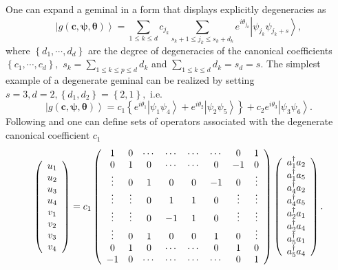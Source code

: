 \documentclass[aps,preprint]{revtex4}%
\begin{document}
One can expand a geminal in a form that displays explicitly degeneracies as
\begin{equation}
\left\vert g\left(  \boldsymbol{c},\boldsymbol{\psi,\theta}\right)
\right\rangle =\sum_{1\leq k\leq d}c_{j_{k}}\sum_{s_{k}+1\leq j_{k}\leq
s_{k}+d_{k}}e^{i\theta_{j_{k}}}\left\vert \psi_{j_{k}}\psi_{j_{k}%
+s}\right\rangle ,
\end{equation}
where $\left\{  d_{1},\cdots,d_{d}\right\}  $ are the degree of degeneracies
of the canonical coefficients $\left\{  c_{1},\cdots,c_{d}\right\}  ,$
$s_{k}=\sum\limits_{1\leq k\leq p\leq d}d_{k}$ and $\sum\limits_{1\leq k\leq
d}d_{k}=s_{d}=s.$ The simplest example of a degenerate geminal can be realized
by setting $s=3,d=2,\left\{  d_{1},d_{2}\right\}  =\left\{  2,1\right\}  ,$
i.e.
\begin{equation}
\left\vert g\left(  \boldsymbol{c},\boldsymbol{\psi,\theta}\right)
\right\rangle =c_{1}\left\{  e^{i\theta_{1}}\left\vert \psi_{1}\psi
_{4}\right\rangle +e^{i\theta_{2}}\left\vert \psi_{2}\psi_{5}\right\rangle
\right\}  +c_{2}e^{i\theta_{3}}\left\vert \psi_{3}\psi_{6}\right\rangle .
\end{equation}
Following \cite{AGPCoherent} and \cite{OrtizWeiner2006} one can define sets of
operators associated with the degenerate canonical coefficient $c_{1}$%
\begin{equation}
\left(
\begin{array}
[c]{c}%
u_{1}\\
u_{2}\\
u_{3}\\
u_{4}\\
v_{1}\\
v_{2}\\
v_{3}\\
v_{4}%
\end{array}
\right)  =c_{1}\left(
\begin{array}
[c]{cccccccc}%
1 & 0 & \cdots & \cdots & \cdots & \cdots & 0 & 1\\
0 & 1 & 0 & \cdots & \cdots & 0 & -1 & 0\\
\vdots & 0 & 1 & 0 & 0 & -1 & 0 & \vdots\\
\vdots & \vdots & 0 & 1 & 1 & 0 & \vdots & \vdots\\
\vdots & \vdots & 0 & -1 & 1 & 0 & \vdots & \vdots\\
\vdots & 0 & 1 & 0 & 0 & 1 & 0 & \vdots\\
0 & 1 & 0 & \cdots & \cdots & 0 & 1 & 0\\
-1 & 0 & \cdots & \cdots & \cdots & \cdots & 0 & 1
\end{array}
\right)  \left(
\begin{array}
[c]{c}%
a_{1}^{\dagger}a_{2}\\
a_{1}^{\dagger}a_{5}\\
a_{4}^{\dagger}a_{2}\\
a_{4}^{\dagger}a_{5}\\
a_{2}^{\dagger}a_{1}\\
a_{2}^{\dagger}a_{4}\\
a_{5}^{\dagger}a_{1}\\
a_{5}^{\dagger}a_{4}%
\end{array}
\right)  .
\end{equation}
\end{document}
